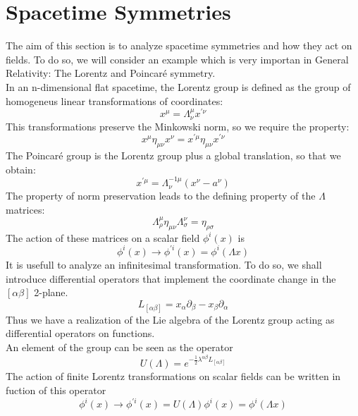 \documentclass[a4paper,10pt]{article}
\begin{document}
\section{Spacetime Symmetries}
The aim of this section is to analyze spacetime symmetries and how they act on fields.
To do so, we will consider an example which is very importan in General Relativity:
The Lorentz and Poincaré symmetry.\\
In an n-dimensional flat spacetime, the Lorentz group is defined as the group of homogeneus linear transformations of coordinates:
\begin{equation}
 x^{\mu} = \Lambda^\mu_\nu x^{'\nu}
\end{equation}
This transformations preserve the Minkowski norm, so we require the property:
\begin{equation}
 x^\mu\eta_{\mu\nu}x^\nu=x^{'\mu}\eta_{\mu\nu}x^{'\nu}
\end{equation}
The Poincaré group is the Lorentz group plus a global translation, so that we obtain:
\begin{equation}
 x^{'\mu}=\Lambda^{-1\mu}_\nu(x^{\nu}-a^{\nu})
\end{equation}
The property of norm preservation leads to the defining property of the $\Lambda$ matrices:
\begin{equation}
 \Lambda^\mu_\rho\eta_{\mu\nu}\Lambda^{\nu}_\sigma=\eta_{\rho\sigma}
\end{equation}
The action of these matrices on a scalar field $\phi^i(x)$ is
\begin{equation}
 \phi^i(x)\rightarrow \phi^{'i}(x)= \phi^i(\Lambda x)
\end{equation}
It is usefull to analyze an infinitesimal transformation. To do so, we shall introduce differential operators that implement the coordinate change in the $[\alpha\beta]$ 2-plane. 
\begin{equation}
 L_{[\alpha\beta]}= x_\alpha \partial_\beta - x_\beta \partial_\alpha
\end{equation}
Thus we have a realization of the Lie algebra of the Lorentz group acting as differential operators on functions.\\
An element of the group can be seen as the operator
\begin{equation}
 U(\Lambda)=e^{-\frac{1}{2} \lambda^{\alpha\beta}L_{[\alpha\beta]}}
\end{equation}
The action of finite Lorentz transformations on scalar fields can be written in fuction of this operator
\begin{equation}
 \phi^i(x)\rightarrow\phi^{'i}(x) = U(\Lambda)\phi^i(x) = \phi^i(\Lambda x)
\end{equation}
\end{document}
